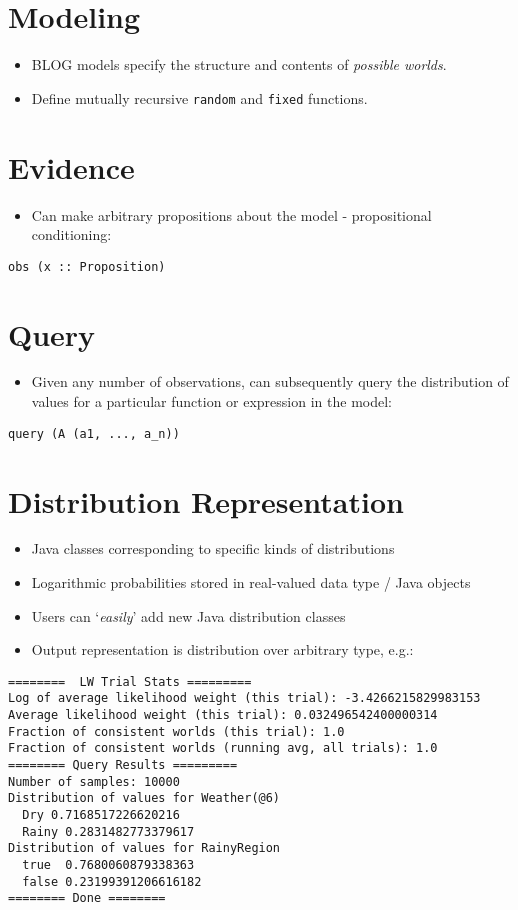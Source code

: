 \documentclass{handout}
\begin{document}
\maketitleinst

\section{Modeling}
\begin{itemize}
\item BLOG models specify the structure and contents of \emph{possible worlds}.
\item Define mutually recursive \verb|random| and \verb|fixed| functions.
\end{itemize}

\section{Evidence}
\begin{itemize}
\item Can make arbitrary propositions about the model - propositional conditioning:
\end{itemize}
\begin{verbatim}
obs (x :: Proposition)
\end{verbatim}

\section{Query}
\begin{itemize}
\item Given any number of observations, can subsequently query the distribution of
      values for a particular function or expression in the model:
\end{itemize}
\begin{verbatim}
query (A (a1, ..., a_n))
\end{verbatim}

\section{Distribution Representation}
\begin{itemize}
\item Java classes corresponding to specific kinds of distributions
\item Logarithmic probabilities stored in real-valued data type / Java objects
\item Users can `\emph{easily}' add new Java distribution classes
\item Output representation is distribution over arbitrary type, e.g.:
\end{itemize}
\begin{verbatim}
========  LW Trial Stats =========
Log of average likelihood weight (this trial): -3.4266215829983153
Average likelihood weight (this trial): 0.032496542400000314
Fraction of consistent worlds (this trial): 1.0
Fraction of consistent worlds (running avg, all trials): 1.0
======== Query Results =========
Number of samples: 10000
Distribution of values for Weather(@6)
  Dry 0.7168517226620216
  Rainy 0.2831482773379617
Distribution of values for RainyRegion
  true  0.7680060879338363
  false 0.23199391206616182
======== Done ========
\end{verbatim}
\end{document}
